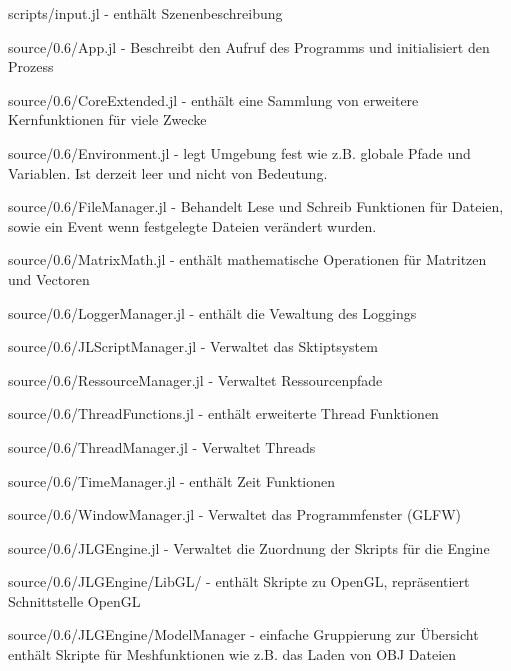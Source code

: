 \documentclass[11pt]{article}
\begin{document}
\begin{flushleft}
\begin{compactitem}
\item scripts/input.jl - enthält Szenenbeschreibung
\item source/0.6/App.jl - Beschreibt den Aufruf des Programms und initialisiert den Prozess
\item source/0.6/CoreExtended.jl - enthält eine Sammlung von erweitere Kernfunktionen für viele Zwecke 
\item source/0.6/Environment.jl - legt Umgebung fest wie z.B. globale Pfade und Variablen. Ist derzeit leer und nicht von Bedeutung.
\item source/0.6/FileManager.jl - Behandelt Lese und Schreib Funktionen für Dateien, sowie ein Event wenn festgelegte Dateien verändert wurden.
\item source/0.6/MatrixMath.jl - enthält mathematische Operationen für Matritzen und Vectoren
\item source/0.6/LoggerManager.jl - enthält die Vewaltung des Loggings
\item source/0.6/JLScriptManager.jl - Verwaltet das Sktiptsystem
\end{compactitem}
\end{flushleft}

\endminipage\hfill
\noindent{}

\begin{flushleft}
\begin{compactitem}
\item source/0.6/RessourceManager.jl - Verwaltet Ressourcenpfade
\item source/0.6/ThreadFunctions.jl - enthält erweiterte Thread Funktionen
\item source/0.6/ThreadManager.jl - Verwaltet Threads
\item source/0.6/TimeManager.jl - enthält Zeit Funktionen
\item source/0.6/WindowManager.jl - Verwaltet das Programmfenster (GLFW)
\item source/0.6/JLGEngine.jl - Verwaltet die Zuordnung der Skripts für die Engine
\item source/0.6/JLGEngine/LibGL/ - enthält Skripte zu OpenGL, repräsentiert Schnittstelle OpenGL
\item source/0.6/JLGEngine/ModelManager - einfache Gruppierung zur Übersicht enthält Skripte für Meshfunktionen wie z.B. das Laden von OBJ Dateien
\end{compactitem}
\end{flushleft}
\end{document}

